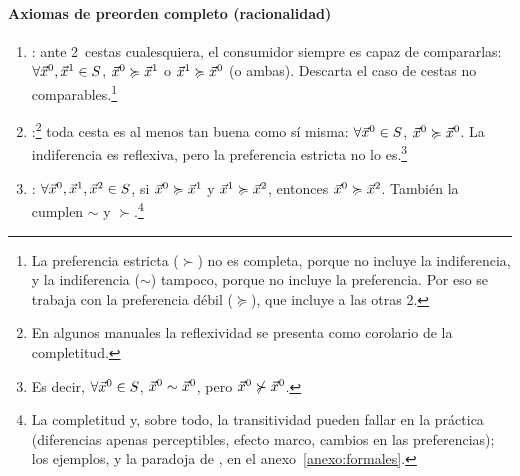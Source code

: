 \documentclass[11pt]{article}
\begin{document}
\paragraph{Axiomas de preorden completo (racionalidad)}

\begin{enumerate}
\item {}: ante 2~cestas cualesquiera, el consumidor siempre es capaz de compararlas: $\forall \vec{x}^0,\vec{x}^1\in S$, $\vec{x}^0\succcurlyeq \vec{x}^1$ o $\vec{x}^1\succcurlyeq \vec{x}^0$ (o ambas). Descarta el caso de cestas no comparables.\footnote{La preferencia estricta ($\succ$) no es completa, porque no incluye la indiferencia, y la indiferencia ($\sim$) tampoco, porque no incluye la preferencia. Por eso se trabaja con la preferencia débil ($\succcurlyeq$), que incluye a las otras 2.}
\item {}:\footnote{En algunos manuales la reflexividad se presenta como corolario de la completitud.} toda cesta es al menos tan buena como sí misma: $\forall \vec{x}^0\in S$, $\vec{x}^0\succcurlyeq \vec{x}^0$. La indiferencia es reflexiva, pero la preferencia estricta no lo es.\footnote{Es decir, $\forall \vec{x}^0\in S$, $\vec{x}^0\sim \vec{x}^0$, pero $\vec{x}^0\nsucc \vec{x}^0$.}
\item {}: $\forall \vec{x}^0,\vec{x}^1,\vec{x}^2\in S$, si $\vec{x}^0\succcurlyeq \vec{x}^1$ y $\vec{x}^1\succcurlyeq \vec{x}^2$, entonces $\vec{x}^0\succcurlyeq \vec{x}^2$. También la cumplen $\sim$ y $\succ$.\footnote{La completitud y, sobre todo, la transitividad pueden fallar en la práctica (diferencias apenas perceptibles, efecto marco, cambios en las preferencias); los ejemplos, y la paradoja de , en el anexo~\ref{anexo:formales}.}
\end{enumerate}
\end{document}
